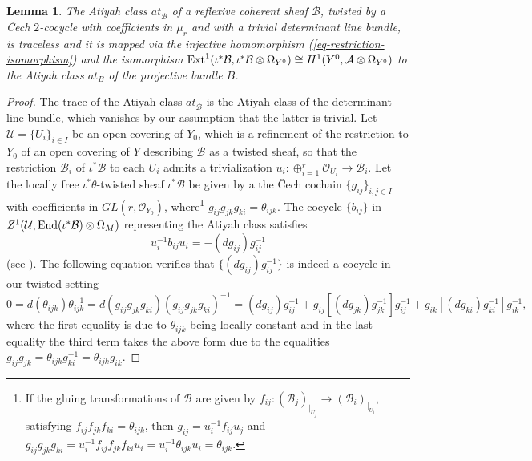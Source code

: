 \documentclass[12pt]{amsart}
\numberwithin{equation}{subsection}
\theoremstyle{plain}
\newtheorem{lem}[thm]{Lemma}
\theoremstyle{definition}
\newcommand{\A}{{\mathcal A}}
\newcommand{\B}{{\mathcal B}}
\newcommand{\U}{{\mathcal U}}
\newcommand{\StructureSheaf}[1]{{\mathcal O}_{#1}}
\newcommand{\restricted}[2]{#1_{\mid_{#2}}}
\newcommand{\Ext}{{\rm Ext}}
\newcommand{\End}{{\rm End}}
\begin{document}
{\begin{lem}
\label{lemma-atiyah-class-of-a-reflexive-twisted-sheaf}  
The Atiyah class
$at^{}_\B$ of a reflexive coherent sheaf $\B$, twisted by a \v{C}ech $2$-cocycle with coefficients in $\mu_r$ and with a trivial determinant line bundle,
is traceless and it is mapped 
via the injective homomorphism (\ref{eq-restriction-isomorphism}) and the isomorphism
$\Ext^1(\iota^*\B,\iota^*\B\otimes \Omega_{Y^0})\cong H^1(Y^0,\A\otimes \Omega_{Y^0})$ to the Atiyah class $at_B$ of the projective bundle $B$.
\end{lem}

\begin{proof}
The trace of the Atiyah class $at_\B^{}$ is the Atiyah class of the determinant line bundle, which vanishes by our assumption that the latter is trivial.
Let $\U=\{U_i\}_{i\in I}$ be an open covering of $Y_0$, which is a refinement of the restriction to $Y_0$ of an open covering of $Y$ describing $\B$ as a twisted sheaf, so that the restriction $\B_i$ of $\iota^*\B$ to each $U_i$ admits a trivialization $u_i:\oplus_{i=1}^r\StructureSheaf{U_i}\rightarrow \B_i$. Let the locally free $\iota^*\theta$-twisted sheaf $\iota^*\B$ be given by a the \v{C}ech cochain $\{g_{ij}\}_{i,j\in I}$ with coefficients in $GL(r,\StructureSheaf{Y_0})$,
where\footnote{If the gluing transformations of $\B$ are given by 
$f_{ij}:(\B_j\restricted{)}{U_j}\rightarrow (\B_i\restricted{)}{U_i}$, satisfying $f_{ij}f_{jk}f_{ki}=\theta_{ijk}$, then $g_{ij}=u_i^{-1}f_{ij}u_j$
and $g_{ij}g_{jk}g_{ki}=u_i^{-1}f_{ij}f_{jk}f_{ki}u_i=u_i^{-1}\theta_{ijk}u_i=\theta_{ijk}$.
} 
$g_{ij}g_{jk}g_{ki}=\theta_{ijk}$. The cocycle $\{b_{ij}\}$ in $Z^1(\U,\End(\iota^*\B)\otimes\Omega_M)$ representing the Atiyah class satisfies
\begin{equation}
\label{eq-GL-cocycle-of-Atiyah-class}
u_i^{-1}b_{ij}u_i=-(dg_{ij})g_{ij}^{-1}
\end{equation}
(see \cite[Eq. (9)]{atiyah}). The following equation verifies that $\{(dg_{ij})g_{ij}^{-1}\}$ is indeed a cocycle in our twisted setting 
\[
0=d(\theta_{ijk})\theta_{ijk}^{-1}=
d(g_{ij}g_{jk}g_{ki})(g_{ij}g_{jk}g_{ki})^{-1}=
(dg_{ij})g_{ij}^{-1}+g_{ij}[(dg_{jk})g_{jk}^{-1}]g_{ij}^{-1}+g_{ik}[(dg_{ki})g_{ki}^{-1}]g_{ik}^{-1},
\]
where the first equality is due to $\theta_{ijk}$ being locally constant and in the last equality the third term takes the above form due to the equalities $g_{ij}g_{jk}=\theta_{ijk}g_{ki}^{-1}=\theta_{ijk}g_{ik}$.


\end{proof}}
\end{document}

